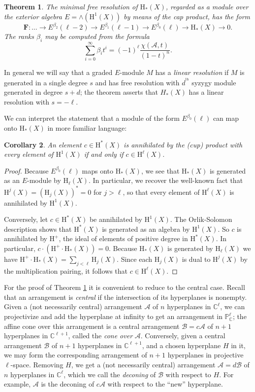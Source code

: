 \documentclass{tran-l}
\newtheorem{theorem}{Theorem}[section]
\newtheorem{corollary}[theorem]{Corollary}
\theoremstyle{definition}
\theoremstyle{remark}
\newcommand{\thh}{{^{\mathrm {th}}}}
\newcommand{\CC}{{\mathbb{C}}}
\newcommand{\PP}{{\mathbb{P}}}
\newcommand{\Acal}{{{\mathcal A}}}
\newcommand{\FF}{{\mathbf{F}}}
\newcommand{\rH}{{\mathrm H}}
\newcommand{\B}{{\mathcal B}}
\begin{document}
\begin{theorem}\label{cohores} 
The minimal free resolution of $\rH_*(X)$,
regarded as a module over the exterior algebra $E=\wedge(\rH^1(X))$
by means of the cap product, has the form
\[
\FF:
\dots\to 
E^{\beta_2}(\ell-2)\to 
E^{\beta_1}(\ell-1)\to 
E^{\beta_0}(\ell)\to 
\rH_*(X)\to 0.
\]  
The ranks $\beta_i$ may be computed from the formula
\[
\sum_{i=0}^\infty \beta_it^i={(-1)}^{\ell}\frac{\chi(\Acal,t)}{{(1-t)}^n}.
\]
\end{theorem}

In general we will say that a graded $E$-module $M$ has a {\it linear
resolution\/} if $M$ is generated in a single degree $s$ and has
free resolution with $d^\thh$ syzygy
module generated in degree $s+d$; the theorem asserts that $H_*(X)$
has a linear resolution with $s=-\ell$.  

We can interpret 
the statement that a
module of the form $E^{\beta_0}(\ell)$ can map onto $\rH_*(X)$ in more
familiar language:

\begin{corollary}\label{socle} 
An element $c\in \rH^*(X)$ is annihilated by
the (cup) product with every element of $\rH^1(X)$ if and only if
$c\in \rH^\ell(X)$.
\end{corollary}

\begin{proof}
Because $E^{\beta_0}(\ell)$ maps onto $\rH_*(X)$, we see that $\rH_*(X)$
is generated as an $E$-module by $\rH_\ell(X)$. In particular, we
recover the well-known fact that $\rH^j(X)= (\rH_j(X))^*= 0$ for
$j>\ell$, so that every element of $\rH^\ell(X)$ is annihilated by
$\rH^1(X)$.

Conversely, let $c\in\rH^*(X)$ be annihilated by $\rH^1(X)$.  The
Orlik-Solomon description shows that $\rH^*(X)$ is generated as an
algebra by $\rH^1(X)$. So $c$ is annihilated by $\rH^+$, the ideal of
elements of positive degree in $\rH^*(X)$. In particular, $c \cdot
(\rH^+\cdot \rH_*(X))=0$.  Because $\rH_*(X)$ is generated by
$\rH_\ell(X)$ we have $\rH^+\cdot \rH_*(X)=\sum_{j<\ell}\rH_j(X)$. 
Since each $\rH_j(X)$ is dual to $\rH^j(X)$ by the multiplication pairing,
it follows that $c\in \rH^\ell(X)$.\end{proof}


For the proof of Theorem \ref{cohores} it is convenient to reduce to
the central case. Recall that an arrangement is {\it central\/} 
if the intersection of its hyperplanes is nonempty.
Given a (not necessarily central) arrangement 
$\Acal$ of $n$ hyperplanes in $\CC^\ell$, we can projectivize and add the
hyperplane at infinity to get an arrangement in ${\PP}^\ell_\CC$;
the affine cone over this arrangement is a central arrangement 
$\B=c\Acal$ of $n+1$ hyperplanes in $\CC^{\ell+1}$,
called the {\it cone over} $\Acal$. Conversely, given a central
arrangement $\B$ of $n+1$ hyperplanes in $\CC^{\ell+1}$, 
and a chosen hyperplane $H$ in it, 
we may form the corresponding arrangement of $n+1$ hyperplanes
in projective $\ell$-space. Removing $H$, we get a (not necessarily
central) arrangement $\Acal=d\B$ of $n$ hyperplanes in 
$\CC^\ell$, which we call the {\it deconing\/} of $\B$
with respect to $H$. For example, $\Acal$ is the deconing
of $c\Acal$ with respect to the ``new'' hyperplane.
\end{document}
